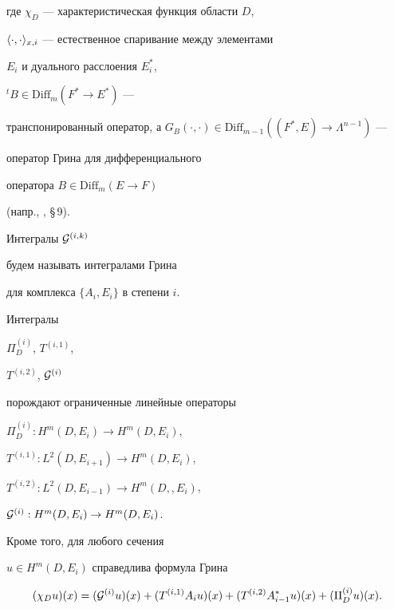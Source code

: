 где $\chi_D$ --- характеристическая функция области $D$,


$\langle\cdot,\cdot\rangle_{x, i}$ --- естественное спаривание между элементами 


$E_i$ и дуального расслоения $E^*_i$,


${}^t \! B\in \mathrm{Dif{}f}_m (F^* \to E^*)$ ---


транспонированный оператор, а $G_B (\cdot,\cdot)\in


\mathrm{Dif{}f}_{m-1} ((F^* ,E) \to \Lambda ^{n-1})$ ---


оператор Грина для дифференциального


оператора $B \in {\mathrm{Dif{}f}_m (E\to F)}$


(напр., \cite{Ta2}, \S\,9).


Интегралы ${\cal G}^{(i,k)}$


будем называть интегралами Грина


для комплекса $\{ A_i, E_i\}$ в степени $i$.








\begin{lem}


\label{l.4.4i} Интегралы


$\Pi ^{(i)}_{D}$, $T^{(i,1)} $,


$T^{(i,2)} $, ${\cal G}^{(i)}$


порождают ограниченные линейные операторы


$\Pi_D ^{(i)} : H^{m} (D, E_i) \to H^{m} (D, E_i)$,


$T^{(i,1)} : L^{2} (D, E_{i+1}) \to H^{m} (D,E_i)$,


$T^{(i,2)} : L^{2} (D, E_{i-1}) \to H^{m} (D, , E_i)$,


${\cal G}^{(i)} : H^{m} (D,E_i) \to H^{m} (D,E_i)$.


Кроме того, для любого сечения


$u \in H^m (D,E_i)$ справедлива формула Грина


\begin{equation} \label{eq.Green}


(\chi_D u) (x) =({\cal G}^{(i)}u) (x) +


(T^{(i,1)} A_i u) (x)+ (T^{(i,2)} A^*_{i-1} u) (x)


+ (\Pi ^{(i)}_D u) (x).


\end{equation}


\end{lem}








